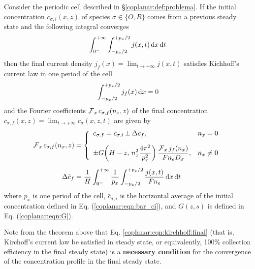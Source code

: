 \begin{teorema}
	\label{coplanar:teo:cf}
	Consider the periodic cell described in \S\ref{coplanar:def:problema}.
	If the initial concentration $c_{\sigma,i}(x,z)$ of species $\sigma \in \{O, R\}$
	comes from a previous steady state and the following integral converges
	\begin{equation}
		\label{coplanar:eqn:i_neta_acumulada}
		\int_{0^{-}}^{+\infty} \int_{-p_{x}/2}^{+p_{x}/2} j(x,t) \,\mathrm{d}x \,\mathrm{d}t
	\end{equation}
	then the final current density $j_{f}(x) = \lim_{t \to +\infty} j(x,t)$
	satisfies Kichhoff's current law in one period of the cell
	\begin{equation}
		\label{coplanar:eqn:kirchhoff:final}
		\int_{-p_{x}/2}^{+p_{x}/2} j_{f}(x) \,\mathrm{d}x = 0
	\end{equation}
	and the Fourier coefficients $\operatorname{\mathcal{F}}_{x} c_{\sigma,f}(n_{x},z)$ of the final concentration 
	$c_{\sigma,f}(x,z) = \lim_{t \to +\infty} c_{\sigma}(x,z,t)$ are given by
	\begin{subequations}
		\begin{align}
			\operatorname{\mathcal{F}}_{x} c_{\sigma,f}(n_{x},z) &=
			\left\{
				\begin{array}{ll}
					\displaystyle
					\bar{c}_{\sigma,f} =
					\bar{c}_{\sigma,i} \pm \Delta \bar{c}_{f}, & n_{x} = 0
					\\[1em]
					\displaystyle
					\pm G\!\left(H-z,\, n_{x}^{2} \frac{4\pi^{2}}{p_{x}^{2}}\right)
					\frac{\operatorname{\mathcal{F}}_{x} j_{f}(n_{x})}{F n_{e} D_{\sigma}}, & n_{x} \neq 0
				\end{array}
			\right.
			\\[0.5em]
			\label{coplanar:eqn:delta_bar_cf}
			\Delta \bar{c}_{f} &= \frac{1}{H}
			\int_{0^{-}}^{+\infty} \frac{1}{p_{x}} \int_{-p_{x}/2}^{+p_{x}/2}
			\frac{j(x,t)}{F n_{e}} \,\mathrm{d}x \,\mathrm{d}t
		\end{align}
	\end{subequations}
	where $p_{x}$ is one period of the cell,
	$\bar{c}_{\sigma,i}$ is the horizontal average of the initial concentration
	defined in Eq. (\ref{coplanar:eqn:bar_ci}),
	and $G(z,s)$ is defined in Eq. (\ref{coplanar:eqn:G}).
\end{teorema}

Note from the theorem above that Eq. \eqref{coplanar:eqn:kirchhoff:final}
(that is, Kirchoff's current law be satisfied in steady state, or equivalently,
100\% collection efficiency in the final steady state)
is a \textbf{necessary condition}
for the convergence of the concentration profile in the final steady state.

